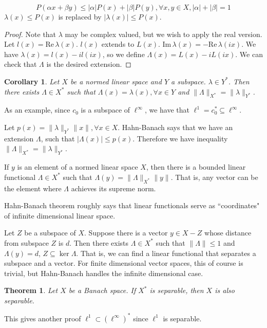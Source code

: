 \documentclass[12pt]{article}
\theoremstyle{plain}
\newtheorem{theorem}[equation]{Theorem}
\newtheorem{corollary}[equation]{Corollary}
\theoremstyle{definition}
\theoremstyle{named}
\newcommand{\<}{\langle}
\renewcommand{\>}{\rangle}
\begin{document}
$$ P(\alpha x + \beta y) \le |\alpha | P(x) + |\beta| P(y), \forall x, y \in X, |\alpha|+| \beta| = 1$$ $\lambda(x) \le P(x)$ is replaced by $|\lambda(x)| \le P(x)$.
\begin{proof}
Note that $\lambda$ may be complex valued, but we wish to apply the real version. Let $l(x) = \mathrm{Re\,} \lambda(x)$. $l(x)$ extends to $L(x)$. $ \mathrm{Im\,} \lambda(x) = - \mathrm{Re\,} \lambda(ix)$. We have $\lambda(x) = l(x) - i l (i x)$, so we define $\Lambda(x) = L(x) - i L(i x )$. We can check that $\Lambda$ is the desired extension. 
\end{proof}
\begin{corollary}
Let $X$ be a normed linear space and $Y$ a subspace. $\lambda \in Y^*$. Then there exists $\Lambda \in X^*$ such that $\Lambda(x) = \lambda(x), \forall x \in Y$ and $\| \Lambda \|_{X^*} = \|\lambda \|_{Y^*}$. 
\end{corollary}
As an example, since $c_0$ is a subspace of $\ell^\infty$, we have that $\ell^1 = c_0^* \subseteq \ell^\infty$. 

Let $p(x) = \| \lambda \|_{Y^*} \| x \|, \forall x \in X$. Hahn-Banach says that we have an extension $\Lambda$, such that $|\Lambda(x)| \le p(x)$. Therefore we have inequality $\| \Lambda \|_{X^*} = \|\lambda \|_{Y^*}$. 

If $y$ is an element of a normed linear space $X$, then there is a bounded linear functional $\Lambda \in X^*$ such that $\Lambda(y) = \| \Lambda \|_{X^*} \| y \|$. That is, any vector can be the element where $\Lambda$ achieves its supreme norm. 

Hahn-Banach theorem roughly says that linear functionals serve as ``coordinates" of infinite dimensional linear space. 

Let $Z$ be a subspace of $X$. Suppose there is a vector $y \in X - Z$ whose distance from subspace $Z$ is $d$. Then there exists $\Lambda \in X^{*}$ such that $\| \Lambda \| \le 1$ and $\Lambda(y) = d$, $Z \subseteq \ker \Lambda$. That is, we can find a linear functional that separates a subspace and a vector. For finite dimensional vector spaces, this of course is trivial, but Hahn-Banach handles the infinite dimensional case. 

\begin{theorem}
Let $X$ be a Banach space. If $X^*$ is separable, then $X$ is also separable. 
\end{theorem}
This gives another proof $\ell^1 \subset (\ell^\infty)^*$ since $\ell^1$ is separable. 
\end{document}
